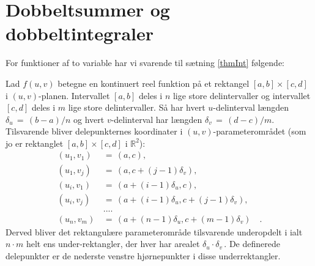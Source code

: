 
\section{Dobbeltsummer og dobbeltintegraler} \label{secDobSummer}
For funktioner af to variable har vi svarende til sætning \ref{thmInt} følgende:

\begin{theorem} \label{thmIntInt}
Lad $f(u, v)$ betegne en kontinuert reel funktion
på et rektangel $[a,b] \times [c,d]\,$ i $(u,
v)$-planen. Intervallet $[a, b]$ deles i $n$ lige
store delintervaller og intervallet $[c, d]$
deles i $m$ lige store delintervaller. Så har
hvert $u$-delinterval længden $\delta_{u} \, = \,
(b-a)/n$ og hvert $v$-delinterval har længden
$\delta_{v} \, = \, (d-c)/m$. Tilsvarende bliver
delepunkternes koordinater i $(u,
v)$-parameter\-om\-rå\-det (som jo er rektanglet
$[a,b]\times[c,d]$ i $\mathbb{R}^{2}$):
\begin{equation}
\begin{aligned}
(u_{1}, v_{1}) \, &= \, (a, c), \\
(u_{1}, v_{j}) \, &= \, (a, c + (j-1)\delta_{v}), \\
(u_{i}, v_{1}) \, &= \, (a + (i-1)\delta_{u}, c), \\
(u_{i}, v_{j}) \, &= \, (a + (i-1)\delta_{u}, c + (j-1)\delta_{v}), \\
 &.... \\
(u_{n}, v_{m}) \, &= \, (a + (n-1)\delta_{u}, c + (m-1)\delta_{v})
\quad .
\end{aligned}
\end{equation}
Derved bliver det rektangulære parameterområde tilsvarende underopdelt i ialt $n\cdot m$ helt ens under-rektangler, der hver har arealet
$\delta_{u} \cdot \delta_{v}\,$. De definerede delepunkter er de nederste venstre hjørnepunkter i disse underrektangler. \\


\end{theorem}
